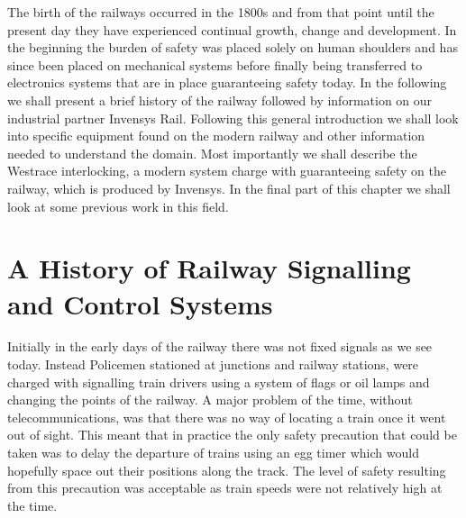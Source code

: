 The birth of the railways occurred in the 1800s and from that point until the present day they have experienced continual growth, change and development. In the beginning the burden of safety was placed solely on human shoulders and has since been placed on mechanical systems before finally being transferred to electronics systems that are in place guaranteeing safety today. In the following we shall present a brief history of the railway followed by information on our industrial partner Invensys Rail.  Following this general introduction we shall look into specific equipment found on the modern railway and other information needed to understand the domain. Most importantly we shall describe the Westrace interlocking, a modern system charge with guaranteeing safety on the railway, which is produced by Invensys. In the final part of this chapter we shall look at some previous work in this field.


\begin{comment}
From their birth in the 1800s to the present day, the railway and its control
systems have seen many advances. Its control and safety has gone from being a
completely manual human based system, to a mechanical system and finally to the electronic
system we see today. We will now look at a brief history of the railway
followed by information on our industrial partner Invensys Rail. We then look
more closely at modern railways and the equipment which constitutes
them. We also study
Westrace interlocking which is produced by Invensys and the
ladder logic programs which run on it. Finally, we look at some previous work
in this field.
\end{comment}

\section{ A History of Railway Signalling and Control Systems}
Initially in the early days of the railway there was not fixed signals as we see today. Instead Policemen stationed at junctions and railway stations, were charged with signalling train drivers using a system of flags or oil lamps and changing the points of the railway. A major problem of the time, without telecommunications, was that there was no way of locating a train once it went out of sight. This meant that in practice the only safety precaution that could be taken was to delay the departure of trains using an egg timer which would hopefully space out their positions along the track. The level of safety resulting from this precaution was acceptable as train speeds were not relatively high at the time.


